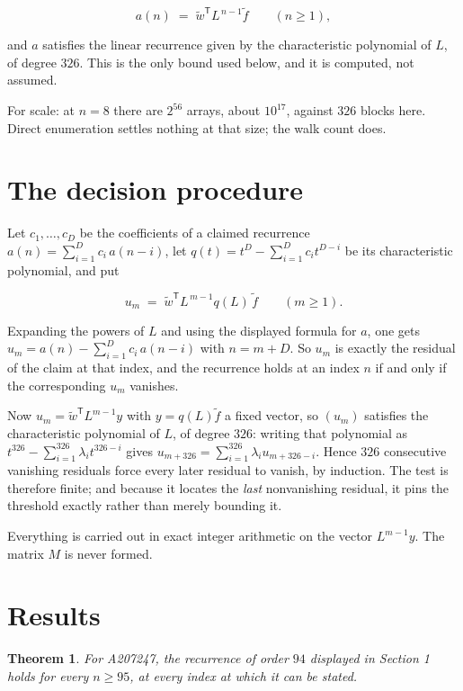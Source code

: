\documentclass[11pt]{article}
\newtheorem{theorem}{Theorem}
\theoremstyle{definition}
\begin{document}
\[a(n) \;=\; \tilde w^{\mathsf T} L^{\,n-1} \tilde f \qquad (n \ge 1),\]

and $a$ satisfies the linear recurrence given by the characteristic polynomial of $L$, of degree $326$. This is the only bound used below, and it is computed, not assumed.

For scale: at $n = 8$ there are $2^{56}$ arrays, about $10^{17}$, against $326$ blocks here. Direct enumeration settles nothing at that size; the walk count does.

\section{The decision procedure}

Let $c_1,\dots,c_D$ be the coefficients of a claimed recurrence $a(n) = \sum_{i=1}^{D} c_i\,a(n-i)$, let $q(t) = t^{D} - \sum_{i=1}^{D} c_i t^{D-i}$ be its characteristic polynomial, and put

\[u_m \;=\; \tilde w^{\mathsf T} L^{\,m-1} q(L)\,\tilde f \qquad (m \ge 1).\]

Expanding the powers of $L$ and using the displayed formula for $a$, one gets $u_m = a(n) - \sum_{i=1}^{D} c_i\,a(n-i)$ with $n = m + D$. So $u_m$ is exactly the residual of the claim at that index, and the recurrence holds at an index $n$ if and only if the corresponding $u_m$ vanishes.

Now $u_m = \tilde w^{\mathsf T} L^{m-1} y$ with $y = q(L)\tilde f$ a fixed vector, so $(u_m)$ satisfies the characteristic polynomial of $L$, of degree $326$: writing that polynomial as $t^{326} - \sum_{i=1}^{326} \lambda_i t^{326-i}$ gives $u_{m+326} = \sum_{i=1}^{326} \lambda_i u_{m+326-i}$. Hence $326$ consecutive vanishing residuals force every later residual to vanish, by induction. The test is therefore finite; and because it locates the {\itshape last} nonvanishing residual, it pins the threshold exactly rather than merely bounding it.

Everything is carried out in exact integer arithmetic on the vector $L^{m-1}y$. The matrix $M$ is never formed.

\section{Results}

\begin{theorem} For A207247, the recurrence of order $94$ displayed in Section 1 holds for every $n \ge 95$, at every index at which it can be stated.\end{theorem}
\end{document}
